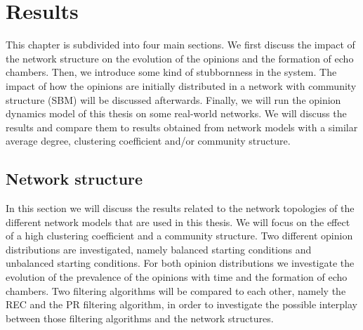 \documentclass[11 pt , letterpaper , twoside , openright]{book}
\begin{document}
\chapter{Results}

This chapter is subdivided into four main sections. We first discuss the impact of the network structure on the evolution of the opinions and the formation of echo chambers. Then, we introduce some kind of stubbornness in the system. The impact of how the opinions are initially distributed in a network with community structure (SBM) will be discussed afterwards. Finally, we will run the opinion dynamics model of this thesis on some real-world networks. We will discuss the results and compare them to results obtained from network models with a similar average degree, clustering coefficient and/or community structure.

\section{Network structure}\label{netw_struc}

In this section we will discuss the results related to the network topologies of the different network models that are used in this thesis. We will focus on the effect of a high clustering coefficient and a community structure. Two different opinion distributions are investigated, namely balanced starting conditions and unbalanced starting conditions. For both opinion distributions we investigate the evolution of the prevalence of the opinions with time and the formation of echo chambers. Two filtering algorithms will be compared to each other, namely the REC and the PR filtering algorithm, in order to investigate the possible interplay between those filtering algorithms and the network structures.\\
\end{document}
